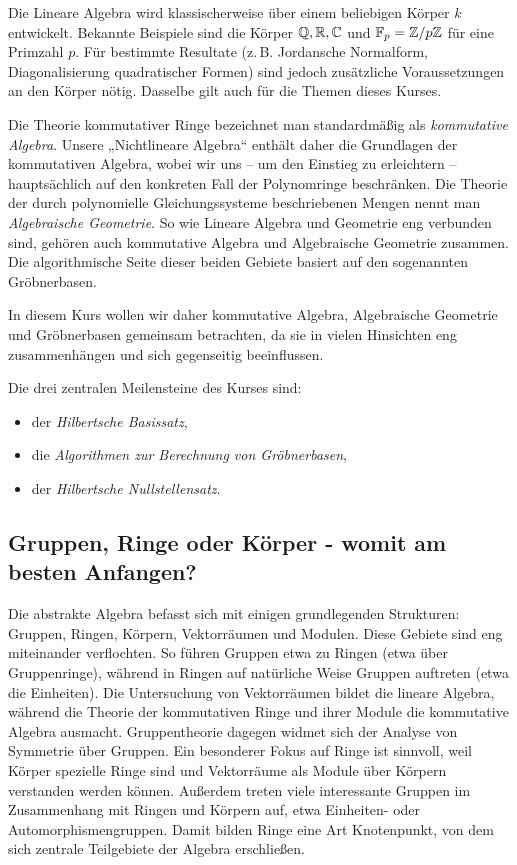 \documentclass[11pt]{article}
\numberwithin{equation}{section}
\begin{document}
Die Lineare Algebra wird klassischerweise über einem beliebigen Körper $k$ entwickelt. Bekannte Beispiele sind die Körper $\mathbb{Q}, \mathbb{R}, \mathbb{C}$ und $\mathbb{F}_p = \mathbb{Z} / p \mathbb{Z}$ für eine Primzahl $p$. Für bestimmte Resultate (z.\,B. Jordansche Normalform, Diagonalisierung quadratischer Formen) sind jedoch zusätzliche Voraussetzungen an den Körper nötig. Dasselbe gilt auch für die Themen dieses Kurses. 

Die Theorie kommutativer Ringe bezeichnet man standardmäßig als \emph{kommutative Algebra}. Unsere „Nichtlineare Algebra“ enthält daher die Grundlagen der kommutativen Algebra, wobei wir uns – um den Einstieg zu erleichtern – hauptsächlich auf den konkreten Fall der Polynomringe beschränken. Die Theorie der durch polynomielle Gleichungssysteme beschriebenen Mengen nennt man \emph{Algebraische Geometrie}. So wie Lineare Algebra und Geometrie eng verbunden sind, gehören auch kommutative Algebra und Algebraische Geometrie zusammen. Die algorithmische Seite dieser beiden Gebiete basiert auf den sogenannten Gröbnerbasen.  

In diesem Kurs wollen wir daher kommutative Algebra, Algebraische Geometrie und Gröbnerbasen gemeinsam betrachten, da sie in vielen Hinsichten eng zusammenhängen und sich gegenseitig beeinflussen. 

Die drei zentralen Meilensteine des Kurses sind:
\begin{itemize}
	\item der \emph{Hilbertsche Basissatz}, 
	\item die \emph{Algorithmen zur Berechnung von Gröbnerbasen}, 
	\item der \emph{Hilbertsche Nullstellensatz}. 
\end{itemize}  

\subsection{Gruppen, Ringe oder Körper - womit am besten Anfangen?}


Die abstrakte Algebra befasst sich mit einigen grundlegenden Strukturen: Gruppen, Ringen, Körpern, Vektorräumen und Modulen. Diese Gebiete sind eng miteinander verflochten. So führen Gruppen etwa zu Ringen (etwa über Gruppenringe), während in Ringen auf natürliche Weise Gruppen auftreten (etwa die Einheiten). Die Untersuchung von Vektorräumen bildet die lineare Algebra, während die Theorie der kommutativen Ringe und ihrer Module die kommutative Algebra ausmacht. Gruppentheorie dagegen widmet sich der Analyse von Symmetrie über Gruppen. Ein besonderer Fokus auf Ringe ist sinnvoll, weil Körper spezielle Ringe sind und Vektorräume als Module über Körpern verstanden werden können. Außerdem treten viele interessante Gruppen im Zusammenhang mit Ringen und Körpern auf, etwa Einheiten- oder Automorphismengruppen. Damit bilden Ringe eine Art Knotenpunkt, von dem sich zentrale Teilgebiete der Algebra erschließen.
\end{document}
